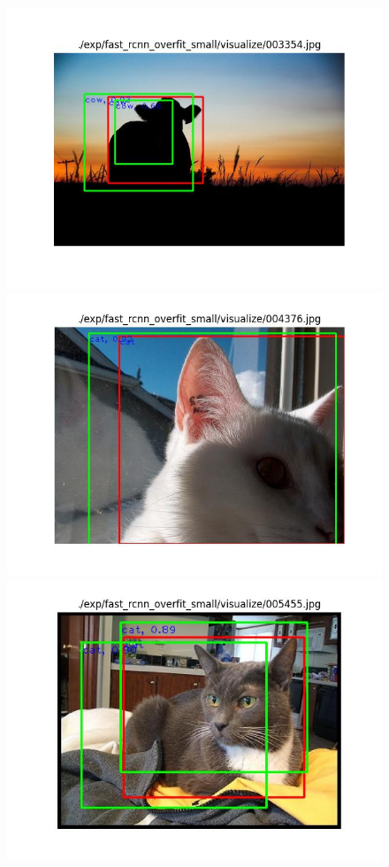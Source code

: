 \documentclass{article}%
\begin{document}
\begin{figure}[H]
    \centering
	\begin{minipage}{0.32\linewidth}
		\centering
		\includegraphics[width=0.9\linewidth]{fast_rcnn_overfit_small/visualize/003354.jpg}
	\end{minipage}
	\begin{minipage}{0.32\linewidth}
		\centering
		\includegraphics[width=0.9\linewidth]{fast_rcnn_overfit_small/visualize/004376.jpg}
	\end{minipage}
    \begin{minipage}{0.32\linewidth}
		\centering
		\includegraphics[width=0.9\linewidth]{fast_rcnn_overfit_small/visualize/005455.jpg}
	\end{minipage}
\end{figure}
\end{document}
